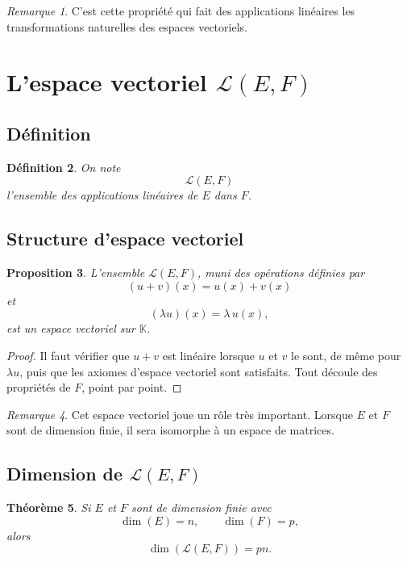 \documentclass[11pt,a4paper]{article}
\newtheorem{definition}{Définition}[section]
\newtheorem{theoreme}[definition]{Théorème}
\newtheorem{proposition}[definition]{Proposition}
\theoremstyle{remark}
\newtheorem{remarque}[definition]{Remarque}
\newcommand{\K}{\mathbb{K}}
\newcommand{\Lin}{\mathcal{L}}
\begin{document}
\begin{remarque}
C’est cette propriété qui fait des applications linéaires les transformations naturelles des espaces vectoriels.
\end{remarque}

\section{L’espace vectoriel \(\Lin(E,F)\)}

\subsection{Définition}

\begin{definition}
On note
\[
\Lin(E,F)
\]
l’ensemble des applications linéaires de \(E\) dans \(F\).
\end{definition}

\subsection{Structure d’espace vectoriel}

\begin{proposition}
L’ensemble \(\Lin(E,F)\), muni des opérations définies par
\[
(u+v)(x)=u(x)+v(x)
\]
et
\[
(\lambda u)(x)=\lambda\,u(x),
\]
est un espace vectoriel sur \(\K\).
\end{proposition}

\begin{proof}
Il faut vérifier que \(u+v\) est linéaire lorsque \(u\) et \(v\) le sont, de même pour \(\lambda u\), puis que les axiomes d’espace vectoriel sont satisfaits. Tout découle des propriétés de \(F\), point par point.
\end{proof}

\begin{remarque}
Cet espace vectoriel joue un rôle très important. Lorsque \(E\) et \(F\) sont de dimension finie, il sera isomorphe à un espace de matrices.
\end{remarque}

\subsection{Dimension de \(\Lin(E,F)\)}

\begin{theoreme}
Si \(E\) et \(F\) sont de dimension finie avec
\[
\dim(E)=n,\qquad \dim(F)=p,
\]
alors
\[
\dim(\Lin(E,F))=pn.
\]
\end{theoreme}
\end{document}
